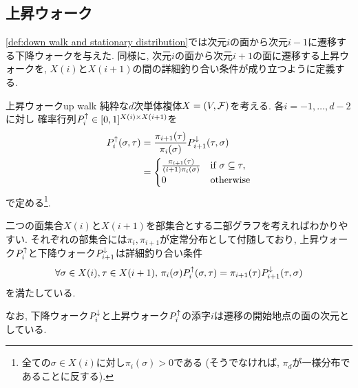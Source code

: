 \subsection{上昇ウォーク}
\cref{def:down walk and stationary distribution}では次元$i$の面から次元$i-1$に遷移する下降ウォークを与えた.
同様に, 次元$i$の面から次元$i+1$の面に遷移する上昇ウォークを, $X(i)$と$X(i+1)$の間の詳細釣り合い条件が成り立つように定義する.
%
\begin{definition}{上昇ウォーク}{up walk}
    純粋な$d$次単体複体$X=(V,\mathcal{F})$を考える.
    各$i=-1,\dots,d-2$に対し
        確率行列$P^{\uparrow}_i \in [0,1]^{X(i) \times X(i+1)}$を
    \begin{align*}
        P^{\uparrow}_i(\sigma,\tau) &= \frac{\pi_{i+1}(\tau)}{\pi_i(\sigma)}P^{\downarrow}_{i+1}(\tau,\sigma) \\
        &= \begin{cases}
            \frac{\pi_{i+1}(\tau)}{(i+1)\pi_i(\sigma)}	& \text{if } \sigma\subseteq \tau,\\
            0 & \text{otherwise}
        \end{cases}
    \end{align*}
    で定める\footnote{全ての$\sigma\in X(i)$に対し$\pi_i(\sigma)>0$である
    (そうでなければ, $\pi_d$が一様分布であることに反する).
    }.
\end{definition}
%
二つの面集合$X(i)$と$X(i+1)$を部集合とする二部グラフを考えればわかりやすい.
それぞれの部集合には$\pi_i,\pi_{i+1}$が定常分布として付随しており,
上昇ウォーク$P^{\uparrow}_i$と下降ウォーク$P^{\downarrow}_{i+1}$は詳細釣り合い条件
\[
    \forall \sigma\in X(i),\tau\in X(i+1),\,\pi_i(\sigma)P^{\uparrow}_i(\sigma,\tau) = \pi_{i+1}(\tau)P^{\downarrow}_{i+1}(\tau,\sigma)
\]
を満たしている.

なお, 下降ウォーク$P^{\downarrow}_{i}$と上昇ウォーク$P^{\uparrow}_i$の添字$i$は遷移の開始地点の面の次元としている.
%

